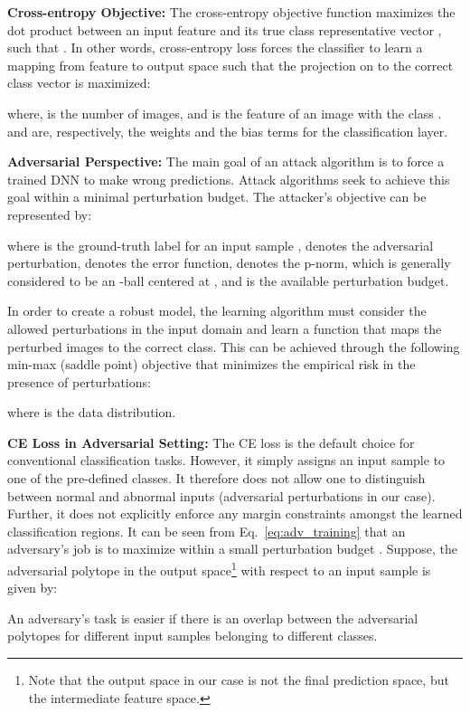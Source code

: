 \documentclass[10pt,twocolumn,letterpaper]{article}
\begin{document}
\noindent \textbf{Cross-entropy Objective:}  The cross-entropy objective function maximizes the dot product between an input feature  and its true class representative vector , such that . In other words, cross-entropy loss forces the classifier to learn a mapping from feature to output space such that the projection on to the correct class vector is maximized:\vspace{-0.55em}

where,  is the number of images, and  is the feature of an  image  with the class .  and  are, respectively, the weights and the bias terms for the classification layer.

\noindent \textbf{Adversarial Perspective:} The main goal of an attack algorithm is to force a trained DNN  to make wrong predictions. Attack algorithms seek to achieve this goal within a minimal perturbation budget. The attacker's objective can be represented by:\vspace{-0.55em}

where  is the ground-truth label for an input sample ,   denotes the adversarial perturbation,  denotes the error function,  denotes the p-norm, which is generally considered to be an -ball centered at , and  is the available perturbation budget.

In order to create a robust model, the learning algorithm must consider the allowed perturbations in the input domain and learn a function that maps the perturbed images to the correct class. This can be achieved through the following min-max (saddle point) objective that minimizes the empirical risk in the presence of perturbations:

where  is the data distribution.

\noindent \textbf{CE Loss in Adversarial Setting:} The CE loss is the default choice for conventional classification tasks. However, it simply assigns an input sample to one of the pre-defined classes. It therefore does not allow one to distinguish between normal and abnormal inputs (adversarial perturbations in our case). Further, it does not explicitly enforce any margin constraints amongst the learned classification regions. It can be seen from Eq.~\ref{eq:adv_training} that an adversary's job is to maximize  within a small perturbation budget . Suppose, the adversarial polytope in the output space\footnote{Note that the output space in our case is not the final prediction space, but the intermediate feature space.} with respect to an input sample  is given by:

An adversary's task is easier if there is an overlap between the adversarial polytopes for different input samples belonging to different classes. 
\end{document}
